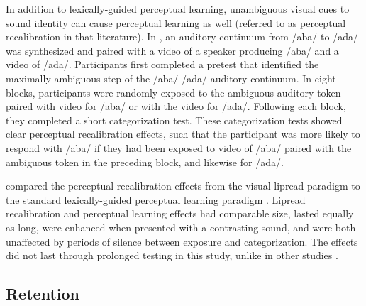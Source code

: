 \documentclass[11pt]{article} %
\begin{document}







In addition to lexically-guided perceptual learning, unambiguous visual cues to sound identity can cause perceptual learning as well (referred to as perceptual recalibration in that literature).
In \citet{Bertelson2003}, an auditory continuum from /aba/ to /ada/ was synthesized and paired with a video of a speaker producing /aba/ and a video of /ada/.  
Participants first completed a pretest that identified the maximally ambiguous step of the /aba/-/ada/ auditory continuum. 
 In eight blocks, participants were randomly exposed to the ambiguous auditory token paired with video for /aba/ or with the video for /ada/.  Following each block, they completed a short categorization test.  
These categorization tests showed clear perceptual recalibration effects, such that the participant was more likely to respond with /aba/ if they had been exposed to video of /aba/ paired with the ambiguous token in the preceding block, and likewise for /ada/.

\citet{vanLinden2007} compared the perceptual recalibration effects from the visual lipread paradigm \citep{Bertelson2003} to the standard lexically-guided perceptual learning paradigm \citep{Norris2003}.  
Lipread recalibration and perceptual learning effects had comparable size, lasted equally as long, were enhanced when presented with a contrasting sound, and were both unaffected by periods of silence between exposure and categorization.  
The effects did not last through prolonged testing in this study, unlike in other studies \citep{Kraljic2005,Eisner2006}.


\subsection{Retention}
\label{sec:retention}
\end{document}
